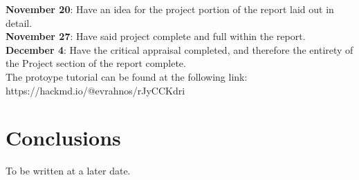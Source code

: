 \documentclass{article}
\theoremstyle{theorem}
\theoremstyle{definition}
\theoremstyle{remark}
\begin{document}
\noindent \textbf{November 20}: Have an idea for the project portion of the report laid out in detail.\\

\noindent \textbf{November 27}: Have said project complete and full within the report.\\

\noindent \textbf{December 4}: Have the critical appraisal completed, and therefore the entirety of the Project section of the report complete. \\

\noindent The protoype tutorial can be found at the following link: https://hackmd.io/@evrahnos/rJyCCKdri

\section{Conclusions}\label{conclusions}

To be written at a later date.
\end{document}
